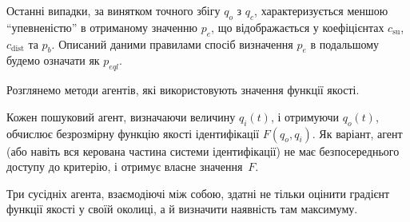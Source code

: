 \documentclass[a4paper,13pt]{atuaref}
\begin{document}
Останні випадки, за винятком точного збігу $q_o$ з $q_c$,
характеризується меншою ``упевненістю'' в отриманому значенню $p_e$,
що відображається у коефіцієнтах
$c_\mathrm{su}$, $c_\mathrm{dist}$ та  $p_b$.
%
Описаний даними правилами спосіб визначення $ p_e $ в подальшому будемо
означати як $p_{eql} $\label{atu:d:p_eql}.


Розглянемо методи агентів, які використовують значення функції якості.

Кожен пошуковий агент, визначаючи величину $ q_ {i} (t) $, і отримуючи $ q_o(t) $,
обчислює безрозмірну функцію якості ідентифікації $ F (q_o, q_i) $. Як
варіант, агент (або навіть вся керована частина системи ідентифікації) не має
безпосереднього доступу до критерію, і отримує власне значення~$F$.

Три сусідніх агента, взаємодіючі між собою, здатні не тільки оцінити градієнт
функції якості у своїй околиці, а й визначити наявність там
максимуму.
\end{document}

